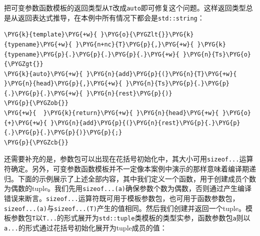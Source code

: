 把可变参数函数模板的返回类型从\texttt{T}改成\texttt{auto}即可修复这个问题。这样返回类型总是从返回表达式推导，在本例中所有情况下都会是\texttt{std::\allowbreak{}string}：



\begin{codeblockbg}
\begin{Verbatim}[commandchars=\\\{\},breaklines=true,breakanywhere=true,fontsize=\codefont,xleftmargin=17bp]
\PYG{k}{template}\PYG{+w}{ }\PYG{o}{\PYGZlt{}}\PYG{k}{typename}\PYG{+w}{ }\PYG{n+nc}{T}\PYG{p}{,}\PYG{+w}{ }\PYG{k}{typename}\PYG{p}{.}\PYG{p}{.}\PYG{p}{.}\PYG{+w}{ }\PYG{n}{Ts}\PYG{o}{\PYGZgt{}}
\PYG{k}{auto}\PYG{+w}{ }\PYG{n}{add}\PYG{p}{(}\PYG{n}{T}\PYG{+w}{ }\PYG{n}{head}\PYG{p}{,}\PYG{+w}{ }\PYG{n}{Ts}\PYG{p}{.}\PYG{p}{.}\PYG{p}{.}\PYG{+w}{ }\PYG{n}{rest}\PYG{p}{)}
\PYG{p}{\PYGZob{}}
\PYG{+w}{  }\PYG{k}{return}\PYG{+w}{ }\PYG{n}{head}\PYG{+w}{ }\PYG{o}{+}\PYG{+w}{ }\PYG{n}{add}\PYG{p}{(}\PYG{n}{rest}\PYG{p}{.}\PYG{p}{.}\PYG{p}{.}\PYG{p}{)}\PYG{p}{;}
\PYG{p}{\PYGZcb{}}
\end{Verbatim}
\end{codeblockbg}


还需要补充的是，参数包可以出现在花括号初始化中，其大小可用\texttt{sizeof...}运算符确定。另外，可变参数函数模板并不一定像本案例中演示的那样意味着编译期递归。下面的示例展示了上述全部内容，其中我们定义一个函数，用于创建成员个数为偶数的tuple。我们先用\texttt{sizeof...(\allowbreak{}a)}确保参数个数为偶数，否则通过产生编译错误来断言。\texttt{sizeof...}运算符既可用于模板参数包，也可用于函数参数包，\texttt{sizeof...(\allowbreak{}a)}与\texttt{sizeof...(\allowbreak{}T)}产生的值相同。然后我们创建并返回一个tuple。模板参数包\texttt{T}以\texttt{T...}的形式展开为\texttt{std::\allowbreak{}tuple}类模板的类型实参，函数参数包\texttt{a}则以\texttt{a...}的形式通过花括号初始化展开为tuple成员的值：



